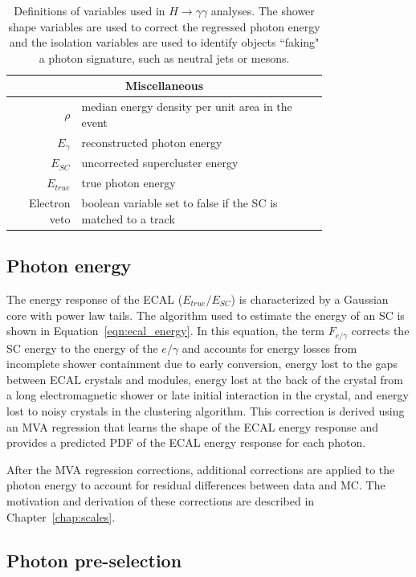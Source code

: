 \begin{table}[htbp]
\begin{tabular}{|r | p{0.78\linewidth}|}
        \multicolumn{2}{c}{\textbf{Miscellaneous}} \\ \hline \hline
        $\rho$ & median energy density per unit area in the event \\
        $E_{\gamma}$ & reconstructed photon energy \\
        $E_{SC}$ & uncorrected supercluster energy \\
        $E_{true}$ & true photon energy \\
        Electron veto & boolean variable set to false if the SC is matched to a track \\ \hline \hline
    \end{tabular}
    \caption[Definitions of variables used in $H\rightarrow\gamma\gamma$ analyses.]{Definitions of variables used in $H\rightarrow\gamma\gamma$ analyses. The shower shape variables are used to correct the regressed photon energy and the isolation variables are used to identify objects ``faking" a photon signature, such as neutral jets or mesons.}
    \label{tab:photon_variables}
\end{table}


\subsection{Photon energy}

The energy response of the ECAL ($E_{true}/E_{SC}$) is characterized by a Gaussian core with power law tails. The algorithm used to estimate the energy of an SC is shown in Equation~\ref{eqn:ecal_energy}. In this equation, the term $F_{e/\gamma}$ corrects the SC energy to the energy of the $e/\gamma$ and accounts for energy losses from incomplete shower containment due to early conversion, energy lost to the gaps between ECAL crystals and modules, energy lost at the back of the crystal from a long electromagnetic shower or late initial interaction in the crystal, and energy lost to noisy crystals in the clustering algorithm. This correction is derived using an MVA regression that learns the shape of the ECAL energy response and provides a predicted PDF of the ECAL energy response for each photon.

After the MVA regression corrections, additional corrections are applied to the photon energy to account for residual differences between data and MC. The motivation and derivation of these corrections are described in Chapter~\ref{chap:scales}.

\subsection{Photon pre-selection}

